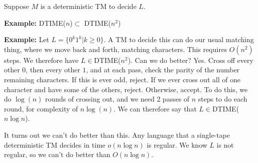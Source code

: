 Suppose $M$ is a deterministic TM to decide $L$.



\textbf{Example:} DTIME($n$)$\subset $ DTIME($n^2$)

\textbf{Example:} Let $L = \{ 0^k1^k | k\geq 0 \}$.  A TM to decide this can do our usual matching thing, where we move back and forth, matching characters.  This requires $O(n^2)$ steps.  We therefore have $L\in$DTIME($n^2$).  Can we do better?  Yes. Cross off every other $0$, then every other $1$, and at each pass, check the parity of the number remaining characters.  If this is ever odd, reject.  If we ever cross out all of one character and have some of the others, reject.  Otherwise, accept.  To do this, we do $\log(n)$ rounds of crossing out, and we need 2 passes of $n$ steps to do each round, for complexity of $n\log(n)$.  We can therefore say that $L\in$DTIME($n\log n$).

It turns out we can't do better than this.  Any language that a single-tape deterministic TM decides in time $o(n\log n)$ is regular.  We know $L$ is not regular, so we can't do better than $O(n\log n)$. 








